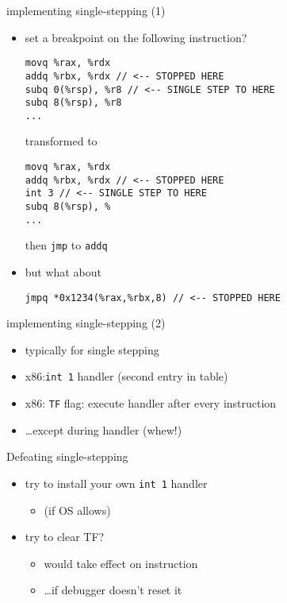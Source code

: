 
\begin{frame}[fragile,label=implSingleStep]{implementing single-stepping (1)}
\lstset{language=myasm,style=small}
    \begin{itemize}
    \item set a breakpoint on the following instruction?
\begin{lstlisting}
movq %rax, %rdx
addq %rbx, %rdx // <-- STOPPED HERE
subq 0(%rsp), %r8 // <-- SINGLE STEP TO HERE
subq 8(%rsp), %r8
...
\end{lstlisting}
transformed to
\begin{lstlisting}
movq %rax, %rdx
addq %rbx, %rdx // <-- STOPPED HERE
int 3 // <-- SINGLE STEP TO HERE
subq 8(%rsp), %
...
\end{lstlisting}
then {\tt jmp} to {\tt addq}
    \item<2> but what about
\begin{lstlisting}
jmpq *0x1234(%rax,%rbx,8) // <-- STOPPED HERE
\end{lstlisting}
\end{itemize}
\end{frame}

\begin{frame}[fragile,label=implSingleStepB]{implementing single-stepping (2)}
\lstset{language=myasm,style=small}
    \begin{itemize}
    \item typically  for single stepping
    \item x86:{\tt int 1} handler (second entry in table)
    \item x86: {\tt TF} flag: execute handler after every instruction
    \item \ldots except during handler (whew!)
    \end{itemize}
\end{frame}

\begin{frame}[fragile,label=defeatSingleStep]{Defeating single-stepping}
    \begin{itemize}
    \item try to install your own {\tt int 1} handler
        \begin{itemize}
        \item (if OS allows)
        \end{itemize}
    \item try to clear TF?
        \begin{itemize}
        \item would take effect on  instruction
        \item \ldots if debugger doesn't reset it
        \end{itemize}
    \end{itemize}
\end{frame}


